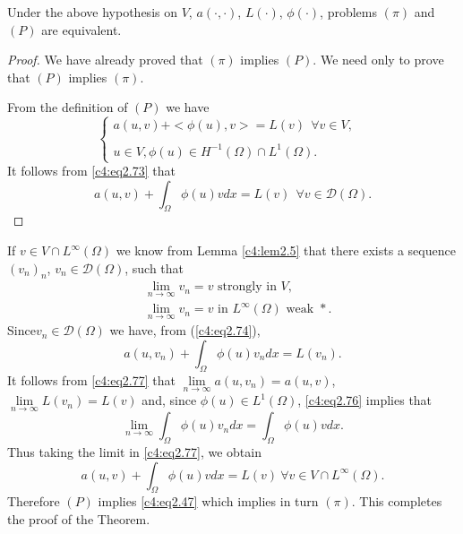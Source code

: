 \begin{theorem}\label{c4:thm2.2}%
Under the above hypothesis on $V$, $a(\cdot , \cdot)$, $L(\cdot)$,
$\phi(\cdot)$,  problems $(\pi)$ and $(P)$ are equivalent. 
\end{theorem}

\begin{proof}
We have already proved that $(\pi)$ implies $(P)$. We need only to
prove that $(P)$ implies $(\pi)$. 

From the definition of $(P)$ we have 
\begin{equation}
\begin{cases}
a(u, v) + < \phi (u), v> = L(v) ~~ \forall v \in V,\\
&\\
u \in V, \phi (u) \in H^{-1}(\Omega) \cap L^1(\Omega).
\end{cases}
\tag{2.73}\label{c4:eq2.73}
\end{equation}
It follows from \eqref{c4:eq2.73} that 
\begin{equation*}
a(u, v) + \int_\Omega \phi (u)v dx = L(v) ~~ \forall v \in \mathscr{D}(\Omega). \tag{2.74}\label{c4:eq2.74}
\end{equation*}
\end{proof}

If $v \in V \cap L^\infty (\Omega)$ we know from Lemma \ref{c4:lem2.5}
that there exists a sequence $(v_n)_n$, $v_n \in \mathscr{D}(\Omega)$,
such that  
\begin{align}
& \lim_{n \to \infty} v_n = v \text{ strongly in } V,
  \tag{2.75}\label{c4:eq2.75}\\ 
& \lim_{n \to \infty} v_n = v \text{ in } L^\infty(\Omega) \text{ weak
  } *. \tag{2.76}\label{c4:eq2.76} 
\end{align}
Since\pageoriginale  $v_n \in \mathscr{D}(\Omega)$ we have, from
(\ref{c4:eq2.74}),  
\begin{equation}
a(u, v_n) + \int_\Omega \phi(u) v_n dx = L(v_n). \tag{2.77}\label{c4:eq2.77}
\end{equation}
It follows from \eqref{c4:eq2.77} that $\lim\limits_{n \to \infty} a (u, v_n) = a(u, v)$, $\lim\limits_{n \to \infty} L (v_n) = L(v)$ and, since $\phi (u) \in L^1(\Omega)$, \eqref{c4:eq2.76} implies that 
$$
\lim_{n \to \infty} \int_\Omega \phi(u)v_n dx = \int_\Omega \phi (u) v dx.
$$
Thus taking the limit in \eqref{c4:eq2.77}, we obtain 
$$
a(u, v) + \int _\Omega \phi(u) v dx = L(v) ~ \forall v \in V \cap L^\infty (\Omega).
$$
Therefore $(P)$ implies \eqref{c4:eq2.47} which implies in turn $(\pi)$. This completes the proof of the Theorem.

